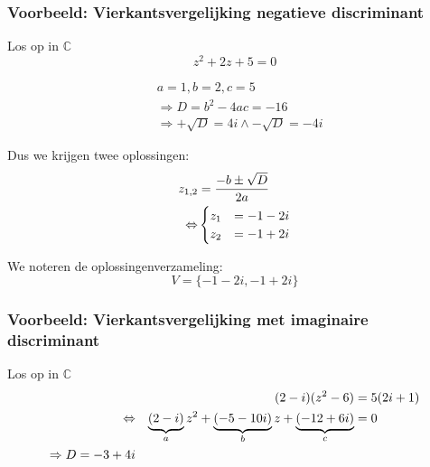\documentclass[12pt,twoside,a4paper]{article}
\begin{document}
\subsubsection*{Voorbeeld: Vierkantsvergelijking negatieve discriminant}

Los op in $\mathbb{C}$
$$z^2 + 2z + 5 = 0$$

\begin{align*}
  & a=1, b=2, c=5\\
  & \Rightarrow  D = b^2 - 4ac = -16\\
  & \Rightarrow  +\sqrt{D} = 4i \wedge -\sqrt{D}=-4i
\end{align*}

Dus we krijgen twee oplossingen:
\begin{align*}
  z_{1,2} &= \dfrac{-b \pm \sqrt{D}}{2a}\\
  \Leftrightarrow & \begin{cases}z_1 &= -1 - 2i\\z_2 &= -1 + 2i\end{cases}
\end{align*}

We noteren de oplossingenverzameling:
$$V=\{ -1-2i, -1+2i \}$$

\subsubsection*{Voorbeeld: Vierkantsvergelijking met imaginaire discriminant}

Los op in $\mathbb{C}$
\begin{align*}
       && (2-i)(z^2-6) &= 5(2i+1)\\
  \Leftrightarrow && \underbrace{(2-i)}_a z^2 + \underbrace{(-5-10i)}_b z + \underbrace{(-12+6i)}_c &= 0\\
  \Rightarrow D = -3+4i
\end{align*}
\end{document}
